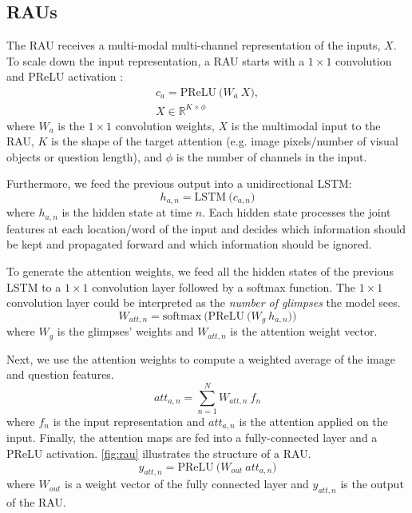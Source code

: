 \documentclass[times,twocolumn, final ,authoryear]{elsarticle}
\makeatletter
\newcommand{\R}{\mathbb{R}}
\newcommand*{\eg}{e.g.\@\xspace}
\makeatother
\begin{document}
  \subsection{\acfp{RAU}}
  The \ac{RAU} receives a multi-modal multi-channel representation of the inputs, $ X$. To scale down the input representation, a RAU starts with a $1\times1$ convolution and PReLU activation \citep{he2015}:
  \begin{equation}
  \begin{gathered}
  c_{a} = \mathrm{PReLU}\ \big(W_a\ X\big),\\
  X \in \R^{K \times \phi}
  \end{gathered}
  \end{equation}
  where $W_a$ is the $1\times1$ convolution weights, $X$ is the multimodal input to the RAU, $K$ is the shape of the target attention (\eg image pixels/number of visual objects or question length), and $\phi$ is the number of channels in the input.
  
  Furthermore, we feed the previous output into a unidirectional LSTM:
  \begin{equation}
  h_{a,n} = \mathrm{LSTM}\ \big(c_{a,n}\big)
  \end{equation}
  where $h_{a,n}$ is the hidden state at time $n$. Each hidden state processes the joint features at each location/word of the input and decides which information should be kept and propagated forward and which information should be ignored.
  
  To generate the attention weights, we feed all the hidden states of the previous LSTM to a $1\times1$ convolution layer followed by a softmax function. The $1\times1$ convolution layer could be interpreted as the {\it number of glimpses} the model sees.
  \begin{equation}
  W_{att,n} = \mathrm{softmax}\ \Big(\mathrm{PReLU}\ \big(W_g\ h_{a,n}\big)\Big)
  \end{equation}
  where $W_g$ is the glimpses' weights and $W_{att,n}$ is the attention weight vector.
  
  Next, we use the attention weights to compute a weighted average of the image and question features.
  \begin{equation}
  att_{a,n} = \sum_{n = 1}^{N} W_{att,n}\ f_n
  \end{equation}
  where $f_n$ is the input representation and $att_{a,n}$ is the attention applied on the input.
  Finally, the attention maps are fed into a fully-connected layer and a PReLU activation. \cref{fig:rau} illustrates the structure of a RAU.
  \begin{equation}
  y_{att,n} = \mathrm{PReLU}\ \big(W_{out}\ att_{a,n}\big)
  \end{equation}
  where $W_{out}$ is a weight vector of the fully connected layer and $y_{att,n}$ is the output of the RAU.
  
\end{document}
